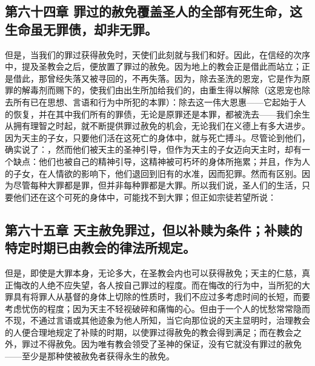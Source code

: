 
\subsection{第六十四章 罪过的赦免覆盖圣人的全部有死生命，这生命虽无罪债，却非无罪。}

但是，当我们的罪过获得赦免时，天使们此刻就与我们和好。因此，在信经的次序中，提及圣教会之后，便放置了罪过的赦免。因为地上的教会正是借此而站立；正是借此，那曾经失落又被寻回的，不再失落。因为，除去圣洗的恩宠，它是作为原罪的解毒剂而赐下的，使我们由出生所加给我们的，由重生得以解除（这恩宠也除去所有已在思想、言语和行为中所犯的本罪）：除去这一伟大恩惠——它起始于人的恢复，并在其中我们所有的罪债，无论是原罪还是本罪，都被洗去——我们余生从拥有理智之时起，就不断提供罪过赦免的机会，无论我们在义德上有多大进步。因为天主的子女，只要他们活在这死亡的身体中，就与死亡搏斗。尽管论到他们，确实说了：，然而他们被天主的圣神引导，但作为天主的子女迈向天主时，却有一个缺点：他们也被自己的精神引导，这精神被可朽坏的身体所拖累；并且，作为人的子女，在人情欲的影响下，他们退回到旧有的水准，因而犯罪。然而有区别。因为尽管每种大罪都是罪，但并非每种罪都是大罪。所以我们说，圣人们的生活，只要他们还在这个可死的身体中，可能找不到大罪；但正如宗徒若望所说：\par


\subsection{第六十五章 天主赦免罪过，但以补赎为条件；补赎的特定时期已由教会的律法所规定。}

但是，即使是大罪本身，无论多大，在圣教会内也可以获得赦免；天主的仁慈，真正悔改的人绝不应失望，各人按自己罪过的程度。而在悔改的行为中，当所犯的大罪具有将罪人从基督的身体上切除的性质时，我们不应过多考虑时间的长短，而要考虑忧伤的程度；因为天主不轻视破碎和痛悔的心。但由于一个人的忧愁常常隐而不现，不通过言语或其他迹象为他人所知，当它向那位说的天主显明时，治理教会的人便合理地规定了补赎的时期，以使罪过得赦免的教会得到满足；而在教会之外，罪过不得赦免。因为唯有教会领受了圣神的保证，没有它就没有罪过的赦免——至少是那种使被赦免者获得永生的赦免。\par

